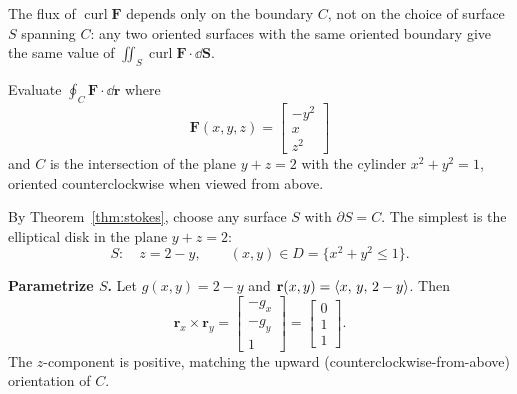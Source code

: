 \begin{remark}
  The flux of $\operatorname{curl}\mathbf{F}$ depends only on the boundary $C$, not on
  the choice of surface $S$ spanning $C$: any two oriented surfaces with the same
  oriented boundary give the same value of $\iint_S\operatorname{curl}\mathbf{F}\cdot\dd{\mathbf{S}}$.
\end{remark}

\begin{example}
  Evaluate $\displaystyle\oint_C \mathbf{F}\cdot\dd{\mathbf{r}}$ where
  \[
    \mathbf{F}(x,y,z) =
    \begin{bmatrix}
      -y^2 \\ x \\ z^2
    \end{bmatrix}
  \]
  and $C$ is the intersection of the plane $y+z=2$ with the cylinder $x^2+y^2=1$,
  oriented counterclockwise when viewed from above.

  \begin{center}
  \end{center}

  By Theorem~\ref{thm:stokes}, choose any surface $S$ with $\partial S = C$. The simplest
  is the elliptical disk in the plane $y+z=2$:
  \[
    S\colon\quad z = 2-y,\qquad (x,y)\in D=\{x^2+y^2\leq 1\}.
  \]

  \textbf{Parametrize $S$.} Let $g(x,y)=2-y$ and
  $\mathbf{r}(x,y) = \langle x,\,y,\,2-y \rangle$. Then
  \[
    \mathbf{r}_x\times\mathbf{r}_y =
    \begin{bmatrix}
      -g_x \\ -g_y \\ 1
    \end{bmatrix}
    =
    \begin{bmatrix}
      0 \\ 1 \\ 1
    \end{bmatrix}
    .
  \]
  The $z$-component is positive, matching the upward (counterclockwise-from-above)
  orientation of $C$.


\end{example}
